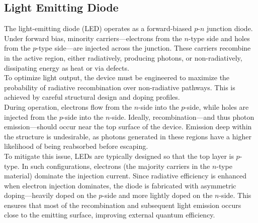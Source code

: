 \subsection{Light Emitting Diode}
The light-emitting diode (LED) operates as a forward-biased \( p\text{-}n \) junction diode. Under forward bias, minority carriers—electrons from the \( n \)-type side and holes from the \( p \)-type side—are injected across the junction. These carriers recombine in the active region, either radiatively, producing photons, or non-radiatively, dissipating energy as heat or via defects.\\
To optimize light output, the device must be engineered to maximize the probability of radiative recombination over non-radiative pathways. This is achieved by careful structural design and doping profiles.\\
During operation, electrons flow from the \( n \)-side into the \( p \)-side, while holes are injected from the \( p \)-side into the \( n \)-side. Ideally, recombination—and thus photon emission—should occur near the top surface of the device. Emission deep within the structure is undesirable, as photons generated in these regions have a higher likelihood of being reabsorbed before escaping.\\
To mitigate this issue, LEDs are typically designed so that the top layer is \( p \)-type. In such configurations, electrons (the majority carriers in the \( n \)-type material) dominate the injection current. Since radiative efficiency is enhanced when electron injection dominates, the diode is fabricated with asymmetric doping—heavily doped on the \( p \)-side and more lightly doped on the \( n \)-side. This ensures that most of the recombination and subsequent light emission occurs close to the emitting surface, improving external quantum efficiency.
